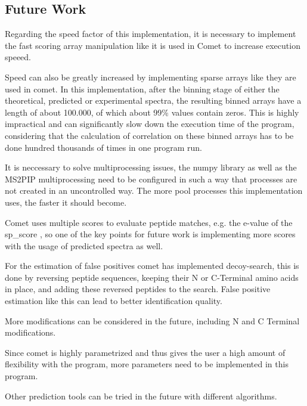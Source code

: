 \documentclass[11pt]{article}
\begin{document}
\subsection{Future Work}
Regarding the speed factor of this implementation, it is necessary to implement the fast scoring array manipulation like it is used in Comet to increase execution speeed. 

Speed can also be greatly increased by implementing sparse arrays like they are used in comet. In this implementation, after the binning stage of either the theoretical, predicted or experimental spectra, the resulting binned arrays have a length of about 100.000, of which about 99\% values contain zeros. This is highly impractical and can significantly slow down the execution time of the program, considering that the calculation of correlation on these binned arrays has to be done hundred thousands of times in one program run.

It is neccessary to solve multiprocessing issues, the numpy library as well as the MS2PIP multiprocessing need to be configured in such a way that processes are not created in an uncontrolled way. The more pool processes this implementation uses, the faster it should become.

Comet uses multiple scores to evaluate peptide matches, e.g. the e-value of the sp\_score , so one of the key points for future work is implementing more scores with the usage of predicted spectra as well.

For the estimation of false positives comet has implemented decoy-search, this is done by reversing peptide sequences, keeping their N or C-Terminal amino acids in place, and adding these reversed peptides to the search. False positive estimation like this can lead to better identification quality.

More modifications can be considered in the future, including N and C Terminal modifications.

Since comet is highly parametrized and thus gives the user a high amount of flexibility with the program, more parameters need to be implemented in this program.

Other prediction tools can be tried in the future with different algorithms.

\printbibliography
\end{document}

